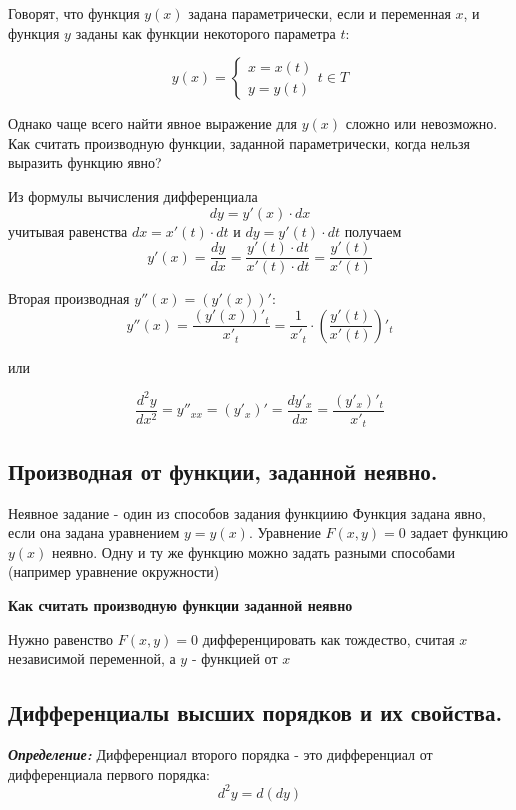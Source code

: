 \documentclass[a4paper,12pt]{article}
\theoremstyle{plain} %
\theoremstyle{definition} %
\theoremstyle{remark} %
\begin{document}
Говорят, что функция $y(x)$ задана параметрически, если и переменная $x$, и функция $y$ заданы как функции некоторого параметра $t$:

\[
	y(x) =
	\begin{cases}
		x = x(t) \\
		y = y(t)
	\end{cases} t\in T
\]

Однако чаще всего найти явное выражение для $y(x)$ сложно или невозможно. Как считать производную функции, заданной параметрически, когда нельзя выразить функцию явно?

Из формулы вычисления дифференциала \[ dy = y'(x) \cdot dx \] учитывая равенства $ dx = x'(t) \cdot dt $ и $ dy = y'(t) \cdot dt $ получаем \[ y'(x) = \frac{dy}{dx} = \frac{y'(t) \cdot dt}{x'(t) \cdot dt} = \frac{y'(t)}{x'(t)} \]

Вторая производная $y''(x) = (y'(x))'$:
\[
	y''(x) = \frac{(y'(x))'_t}{x'_t} = \frac{1}{x'_t} \cdot \left( \frac{y'(t)}{x'(t)} \right)'_t
\]

или

\[
	\frac{d^2y}{dx^2} = y''_{xx} = (y'_x)' = \frac{dy'_x}{dx} = \frac{(y'_x)'_t}{x'_t}
\]

\newpage
{}
\subsection*{Производная от функции, заданной неявно.                                                   }

Неявное задание - один из способов задания функциию Функция задана явно, если она задана уравнением $y = y(x)$. Уравнение $F(x, y) = 0$ задает функцию $y(x)$ неявно. Одну и ту же функцию можно задать разными способами (например уравнение окружности)

\textbf{Как считать производную функции заданной неявно}

Нужно равенство $F(x, y) = 0$ дифференцировать как тождество, считая $x$ независимой переменной, а $y$ - функцией от $x$



\newpage
{}
\subsection*{Дифференциалы высших порядков и их свойства.                                               }
\textit{\textbf{Определение:}} Дифференциал второго порядка - это дифференциал от дифференциала первого порядка:
\[
	d^2y = d(dy)
\]
\end{document}
